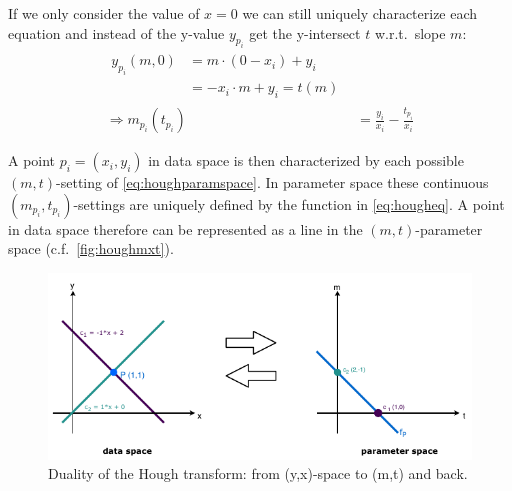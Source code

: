 If we only consider the value of $x=0$ we can still uniquely characterize each equation and instead of the y-value $y_{p_i}$ get the y-intersect $t$ w.r.t.\ slope $m$:
\begin{align}\label{eq:houghparamspace}
\begin{split}
y_{p_i}(m,0) 
&= m \cdot (0 - x_i) + y_i\\
&= -x_i \cdot m + y_i = t(m)
\end{split}\\
\label{eq:hougheq}
\Rightarrow m_{p_i}(t_{p_i}) &= \frac{y_i}{x_i} - \frac{t_{p_i}}{x_i}
\end{align}

A point $p_i = (x_i, y_i)$ in data space is then characterized by each possible $(m,t)$-setting of \autoref{eq:houghparamspace}. In parameter space these continuous $(m_{p_i},t_{p_i})$-settings are uniquely defined by the function in \autoref{eq:hougheq}. A point in data space therefore can be represented as a line in the $(m,t)$-parameter space (c.f.\ \autoref{fig:houghmxt}).  %

\begin{figure}
    \centering
    \includegraphics{figures/HoughMXT.pdf}
    \caption{Duality of the Hough transform: from (y,x)-space to (m,t) and back.}
    \label{fig:houghmxt}
\end{figure}

